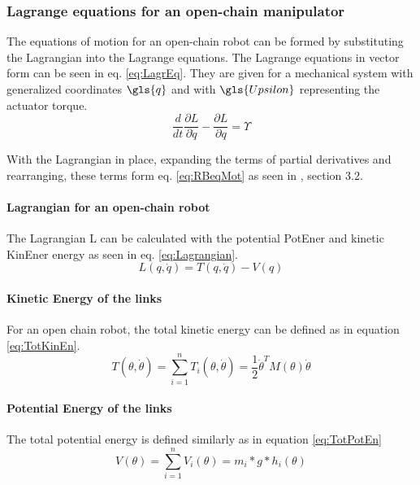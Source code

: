 \subsubsection{Lagrange equations for an open-chain manipulator}

The equations of motion for an open-chain robot can be formed by substituting the Lagrangian into the Lagrange equations. 
The Lagrange equations in vector form can be seen in eq. \ref{eq:LagrEq}. They are given for a mechanical system with generalized coordinates $\gls{q}$ and with $\gls{Upsilon}$ representing the actuator torque.
\begin{equation} \label{eq:LagrEq}
\frac{d}{dt}\frac{\partial L}{\partial \dot{q}} - \frac{\partial L}{\partial q} = \Upsilon
\end{equation}

With the Lagrangian in place, expanding the terms of partial derivatives and rearranging, these terms form eq. \ref{eq:RBeqMot} as seen in \cite{MathIntroRobManip}, section 3.2.\\

\paragraph{Lagrangian for an open-chain robot}

The Lagrangian \gls{L} can be calculated with the potential \gls{PotEner} and kinetic \gls{KinEner} energy as seen in eq. \ref{eq:Lagrangian}. 
\begin{equation} \label{eq:Lagrangian}
	L(q,\dot{q}) = T(q,\dot{q}) - V(q)
\end{equation} 



\paragraph{Kinetic Energy of the links}
For an open chain robot, the total kinetic energy can be defined as in equation \ref{eq:TotKinEn}.
\begin{equation}\label{eq:TotKinEn}
T(\theta,\dot{\theta}) = \sum_{i=1}^{n} T_i(\theta,\dot{\theta}) = \frac{1}{2} \dot{\theta}^T M(\theta)\dot{\theta}
\end{equation}

\paragraph{Potential Energy of the links}
The total potential energy is defined similarly as in equation \ref{eq:TotPotEn}
\begin{equation}\label{eq:TotPotEn}
V(\theta)=\sum_{i=1}^{n} V_i(\theta) = m_i*g*h_i(\theta)
\end{equation}

